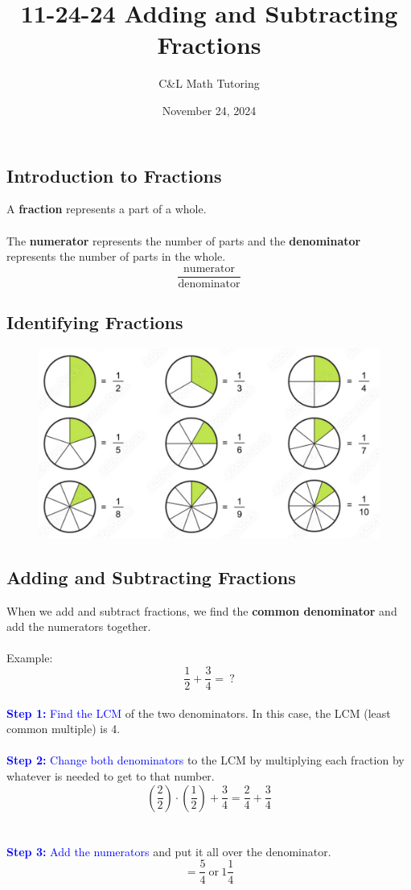 \documentclass[a4paper, 12pt]{article}
\title{11-24-24 Adding and Subtracting Fractions}
\author{C\&L Math Tutoring}
\date{November 24, 2024}
\begin{document}
\maketitle

\subsection*{Introduction to Fractions}
A \textbf{fraction} represents a part of a whole.
\\\\
The \textbf{numerator} represents the number of parts and the \textbf{denominator} represents the number of parts in the whole.
\\
$$\frac{\text{numerator}}{\text{denominator}}$$

\subsection*{Identifying Fractions}

\begin{figure}[H]
    \centering    \includegraphics[width=0.7\linewidth]{frac.png}
    \label{fig:1}
\end{figure}

\subsection*{Adding and Subtracting Fractions}
When we add and subtract fractions, we find the \textbf{common denominator} and add the numerators together.
\\\\
Example:
$$\frac{1}{2} + \frac{3}{4} = \: ?$$
\\
\textcolor{blue}{\textbf{Step 1:} Find the LCM} of the two denominators. In this case, the LCM (least common multiple) is 4.
\\\\
\textcolor{blue}{\textbf{Step 2:} Change both denominators} to the LCM by multiplying each fraction by whatever is needed to get to that number.
$$\left(\frac{2}{2}\right) \cdot \left(\frac{1}{2}\right) + \frac{3}{4} = \frac{2}{4} + \frac{3}{4} $$
\\\\
\textcolor{blue}{\textbf{Step 3:} Add the numerators} and put it all over the denominator.
$$= \frac{5}{4} \: \text{or} \: 1\frac{1}{4}$$
\end{document}
